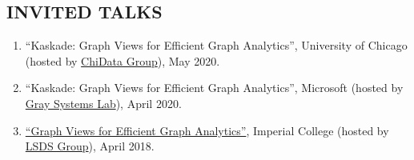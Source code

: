 \documentclass[centered,overlapped]{res}
\begin{document}
\begin{resume}
\section{INVITED TALKS}
\begin{enumerate}
  \item ``Kaskade: Graph Views for Efficient Graph Analytics'', University of Chicago (hosted by \href{https://data.cs.uchicago.edu/}{ChiData Group}), May 2020.
  \item ``Kaskade: Graph Views for Efficient Graph Analytics'', Microsoft (hosted by \href{https://azuredata.microsoft.com}{Gray Systems Lab}), April 2020.
  \item \href{http://lsds.doc.ic.ac.uk/content/graph-views-efficient-graph-analytics-collaboration-microsoft-cisl}{``Graph Views for Efficient Graph Analytics''}, Imperial College (hosted by \href{https://lsds.doi.ic.ac.uk}{LSDS Group}), April 2018.
\end{enumerate}


\end{resume}
\end{document}
